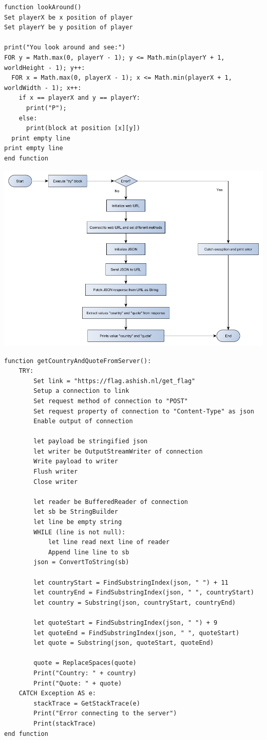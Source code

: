 \begin{lstlisting}
function lookAround()
Set playerX be x position of player
Set playerY be y position of player

print("You look around and see:")
FOR y = Math.max(0, playerY - 1); y <= Math.min(playerY + 1, worldHeight - 1); y++:
  FOR x = Math.max(0, playerX - 1); x <= Math.min(playerX + 1, worldWidth - 1); x++:
    if x == playerX and y == playerY:
      print("P");
    else:
      print(block at position [x][y])
  print empty line
print empty line
end function
\end{lstlisting}
\newpage

{\includegraphics[width=\textwidth]{../flowchart/getCountryAndQuoteFromServer.png}}

\begin{lstlisting}
function getCountryAndQuoteFromServer():
    TRY:
        Set link = "https://flag.ashish.nl/get_flag"
        Setup a connection to link
        Set request method of connection to "POST"
        Set request property of connection to "Content-Type" as json
        Enable output of connection

        let payload be stringified json
        let writer be OutputStreamWriter of connection
        Write payload to writer
        Flush writer
        Close writer
        
        let reader be BufferedReader of connection
        let sb be StringBuilder
        let line be empty string
        WHILE (line is not null):
            let line read next line of reader
            Append line line to sb
        json = ConvertToString(sb)
        
        let countryStart = FindSubstringIndex(json, " ") + 11
        let countryEnd = FindSubstringIndex(json, " ", countryStart)
        let country = Substring(json, countryStart, countryEnd)
        
        let quoteStart = FindSubstringIndex(json, " ") + 9
        let quoteEnd = FindSubstringIndex(json, " ", quoteStart)
        let quote = Substring(json, quoteStart, quoteEnd)
        
        quote = ReplaceSpaces(quote)
        Print("Country: " + country)
        Print("Quote: " + quote)
    CATCH Exception AS e:
        stackTrace = GetStackTrace(e)
        Print("Error connecting to the server")
        Print(stackTrace)
end function
\end{lstlisting}
